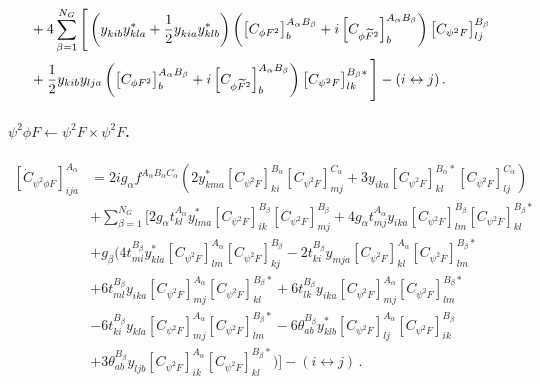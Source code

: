 \begin{align}
    &+ 4 \sum_{\beta=1}^{N_G}\Bigg[ \left(y_{kib}^{\phantom *}y_{kla}^* + \frac{1}{2}y_{kia}^{\phantom *}y_{klb}^*\right)\left(\left[C_{\phi F^2}\right]_{b}^{A_\alpha B_\beta}+i\left[C_{\phi \tildee F^2}\right]_{b}^{A_\alpha B_\beta}\right)\left[C_{\psi^2 F}\right]_{lj}^{B_\beta}\nonumber\\
    &+ \frac{1}{2}y_{kib} y_{lja}\left(\left[C_{\phi F^2}\right]_{b}^{A_\alpha B_\beta}+i\left[C_{\phi \tildee F^2}\right]_{b}^{A_\alpha B_\beta}\right)\left[C_{\psi^2 F}\right]_{lk}^{B_\beta*}\Bigg] - (i\leftrightarrow j)
    \,.
\end{align}

\paragraph{$\psi^2\phi F \leftarrow \psi^2 F \times \psi^2 F$.}

\begin{align}
    \left[\dot C_{\psi^2 \phi F}\right]_{ija}^{A_\alpha} & = 
    2i g_\alpha f^{A_\alpha B_\alpha C_\alpha}\left(
    2y^*_{kma}\left[C_{\psi^2 F}\right]_{ki}^{B_\alpha}\left[C_{\psi^2 F}\right]_{mj}^{C_\alpha}
    + 3 y_{ika}\left[C_{\psi^2 F}\right]_{kl}^{B_\alpha *}\left[C_{\psi^2 F}\right]_{lj}^{C_\alpha}
    \right)
    \nonumber \\&
    +\sum_{\beta=1}^{N_G}\Bigg[
    2 g_\alpha t^{A_\alpha}_{kl} y^*_{lma}\left[C_{\psi^2 F}\right]_{ik}^{B_\beta}\left[C_{\psi^2 F}\right]_{mj}^{B_\beta}
    + 4 g_\alpha t^{A_\alpha}_{mj} y_{ika}\left[C_{\psi^2 F}\right]_{lm}^{B_\beta}\left[C_{\psi^2 F}\right]_{kl}^{B_\beta *}
    \nonumber \\&
    + g_\beta \Bigg(
    4 t^{B_\beta}_{mi} y^*_{kla}\left[C_{\psi^2 F}\right]_{lm}^{A_\alpha}\left[C_{\psi^2 F}\right]_{kj}^{B_\beta}
    -2 t^{B_\beta}_{ki} y_{mja}\left[C_{\psi^2 F}\right]_{kl}^{A_\alpha}\left[C_{\psi^2 F}\right]_{lm}^{B_\beta *}
    \nonumber \\&
    +6 t^{B_\beta}_{ml} y_{ika}\left[C_{\psi^2 F}\right]_{mj}^{A_\alpha}\left[C_{\psi^2 F}\right]_{kl}^{B_\beta *}
    + 6 t^{B_\beta}_{lk} y_{ika}\left[C_{\psi^2 F}\right]_{mj}^{A_\alpha}\left[C_{\psi^2 F}\right]_{lm}^{B_\beta *}
    \nonumber \\&
    -6 t^{B_\beta}_{ki}y_{kla}\left[C_{\psi^2 F}\right]_{mj}^{A_\alpha}\left[C_{\psi^2 F}\right]_{lm}^{B_\beta *}
    -6 \theta^{B_\beta}_{ab}y^*_{klb} \left[C_{\psi^2 F}\right]_{lj}^{A_\alpha}\left[C_{\psi^2 F}\right]_{ik}^{B_\beta}
    \nonumber \\&
    +3 \theta^{B_\beta}_{ab}y_{ljb} \left[C_{\psi^2 F}\right]_{ik}^{A_\alpha}\left[C_{\psi^2 F}\right]_{kl}^{B_\beta *}
    \Bigg)
    \Bigg] - \left(i \leftrightarrow j\right)\,.
\end{align}

